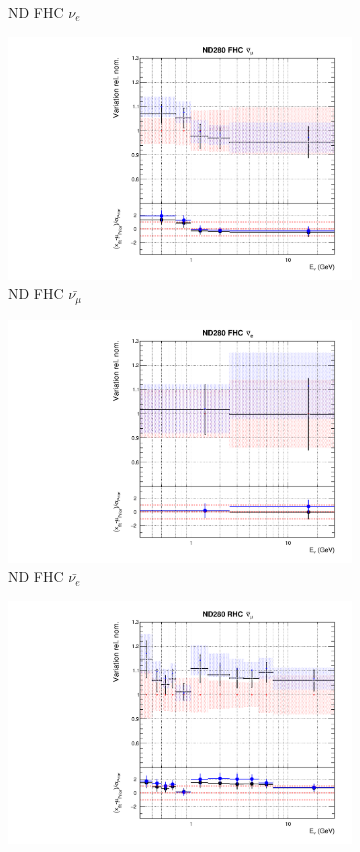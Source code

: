 \begin{figure}
\begin{subfigure}{0.24\textwidth}
  \caption{ND FHC $\nu_e$}
\end{subfigure}
\begin{subfigure}{0.24\textwidth}
  \centering
  \includegraphics[width=0.95\linewidth]{figs/comp5q2vs8q2flux2}
  \caption{ND FHC $\bar{\nu_{\mu}}$}
\end{subfigure}
\begin{subfigure}{0.24\textwidth}
  \centering
  \includegraphics[width=0.95\linewidth]{figs/comp5q2vs8q2flux3}
  \caption{ND FHC $\bar{\nu_{e}}$}
\end{subfigure}
\begin{subfigure}{0.24\textwidth}
  \centering
  \includegraphics[width=0.95\linewidth]{figs/comp5q2vs8q2flux4}

\end{subfigure}
\end{figure}
